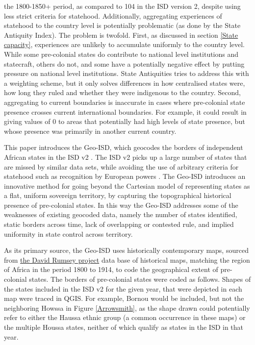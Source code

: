\documentclass[12pt]{article}
\begin{document}
the 1800-1850+ period, as compared to 104 in the ISD version 2, despite using
less strict criteria for statehood. Additionally, aggregating experiences of
statehood to the country level is potentially problematic (as done by the State
Antiquity Index). The problem is twofold. First, as discussed in section
\ref{State capacity}, experiences are unlikely to accumulate uniformly to the
country level. While some pre-colonial states do contribute to national level
institutions and statecraft, others do not, and some have a potentially negative
effect by putting pressure on national level institutions. State Antiquities
tries to address this with a weighting scheme, but it only solves differences in
how centralised states were, how long they ruled and whether they were
indigenous to the country. Second, aggregating to current boundaries is
inaccurate in cases where pre-colonial state presence crosses current
international boundaries. For example, it could result in giving values of 0 to
areas that potentially had high levels of state presence, but whose presence was
primarily in another current country.

This paper introduces the Geo-ISD, which geocodes the borders of independent
African states in the ISD v2 \citep{Butcher2020}. The ISD v2 picks up a large
number of states that are missed by similar data sets, while avoiding the use of
arbitrary criteria for statehood such as recognition by European powers
\citep{Butcher2020}. The Geo-ISD introduces an innovative method for going
beyond the Cartesian model of representing states as a flat, uniform sovereign
territory, by capturing the topographical historical presence of pre-colonial
states. In this way the Geo-ISD addresses some of the weaknesses of existing
geocoded data, namely the number of states identified, static borders across
time, lack of overlapping or contested rule, and implied uniformity in state
control across territory.

As its primary source, the Geo-ISD uses historically contemporary maps, sourced
from \href{https://www.davidrumsey.com}{the David Rumsey project} data base of
historical maps, matching the region of Africa in the period 1800 to 1914, to
code the geographical extent of pre-colonial states. The borders of pre-colonial
states were coded as follows.
Shapes of the states included in the ISD v2 for the given year, that were
depicted in each map were traced in QGIS. For example, Bornou would be included,
but not the neighboring Howssa in Figure \ref{Arrowsmith}, as the shape drawn
could potentially refer to either the Haussa ethnic group (a common occurrence
in these maps) or the multiple Houssa states, neither of which qualify as states
in the ISD in that year. 
\end{document}
